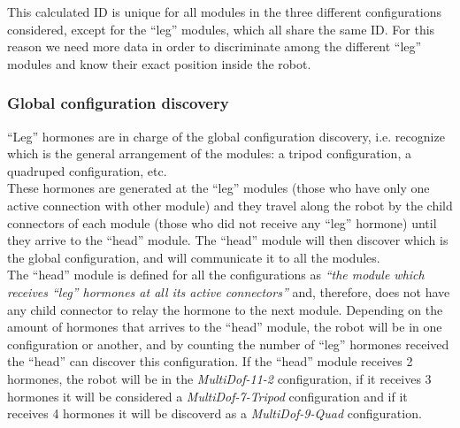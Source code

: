 This calculated ID is unique for all modules in the three different configurations considered, except for the ``leg'' modules, which all share the same ID. For this reason we need more data in order to discriminate among the different ``leg'' modules and know their exact position inside the robot.\\
 
\subsubsection{Global configuration discovery}
\label{hormone_algorithm_leg}
``Leg'' hormones are in charge of the global configuration discovery, i.e. recognize which is the general arrangement of the modules: a tripod configuration, a quadruped configuration, etc.\\

These hormones are generated at the ``leg'' modules (those who have only one active connection with other module) and they travel along the robot by the child connectors of each module (those who did not receive any ``leg'' hormone) until they arrive to the ``head'' module. The ``head'' module will then discover which is the global configuration, and will communicate it to all the modules.\\

The ``head'' module is defined for all the configurations as \emph{``the module which receives ``leg'' hormones at all its active connectors''} and, therefore, does not have any child connector to relay the hormone to the next module. Depending on the amount of hormones that arrives to the ``head'' module, the robot will be in one configuration or another, and by counting the number of ``leg'' hormones received the ``head'' can discover this configuration. If the ``head'' module receives 2 hormones, the robot will be in the \emph{MultiDof-11-2} configuration, if it receives 3 hormones it will be considered a \emph{MultiDof-7-Tripod} configuration and if it receives 4 hormones it will be discoverd as a \emph{MultiDof-9-Quad} configuration.\\

